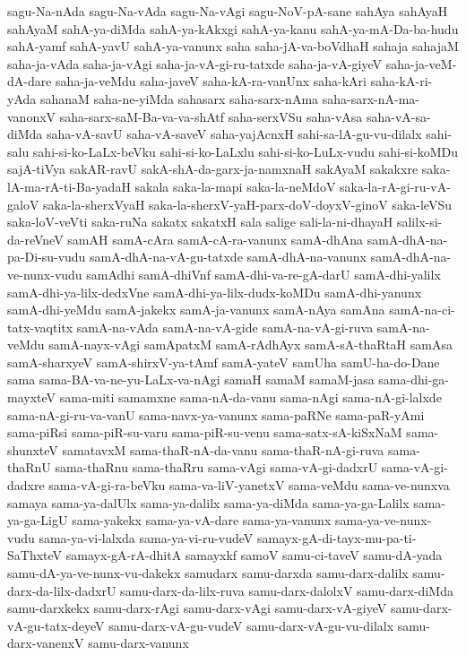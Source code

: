 {sagu-Na-nAda
sagu-Na-vAda
sagu-Na-vAgi
sagu-NoV-pA-sane
sahAya
sahAyaH
sahAyaM
sahA-ya-diMda
sahA-ya-kAkxgi
sahA-ya-kanu
sahA-ya-mA-Da-ba-hudu
sahA-yamf
sahA-yavU
sahA-ya-vanunx
saha
saha-jA-va-boVdhaH
sahaja
sahajaM
saha-ja-vAda
saha-ja-vAgi
saha-ja-vA-gi-ru-tatxde
saha-ja-vA-giyeV
saha-ja-veM-dA-dare
saha-ja-veMdu
saha-javeV
saha-kA-ra-vanUnx
saha-kAri
saha-kA-ri-yAda
sahanaM
saha-ne-yiMda
sahasarx
saha-sarx-nAma
saha-sarx-nA-ma-vanonxV
saha-sarx-saM-Ba-va-va-shAtf
saha-serxVSu
saha-vAsa
saha-vA-sa-diMda
saha-vA-savU
saha-vA-saveV
saha-yajAcnxH
sahi-sa-lA-gu-vu-dilalx
sahi-salu
sahi-si-ko-LaLx-beVku
sahi-si-ko-LaLxlu
sahi-si-ko-LuLx-vudu
sahi-si-koMDu
sajA-tiVya
sakAR-ravU
sakA-shA-da-garx-ja-namxnaH
sakAyaM
sakakxre
saka-lA-ma-rA-ti-Ba-yadaH
sakala
saka-la-mapi
saka-la-neMdoV
saka-la-rA-gi-ru-vA-galoV
saka-la-sherxVyaH
saka-la-sherxV-yaH-parx-doV-doyxV-ginoV
saka-leVSu
saka-loV-veVti
saka-ruNa
sakatx
sakatxH
sala
salige
sali-la-ni-dhayaH
salilx-si-da-reVneV
samAH
samA-cAra
samA-cA-ra-vanunx
samA-dhAna
samA-dhA-na-pa-Di-su-vudu
samA-dhA-na-vA-gu-tatxde
samA-dhA-na-vanunx
samA-dhA-na-ve-nunx-vudu
samAdhi
samA-dhiVnf
samA-dhi-va-re-gA-darU
samA-dhi-yalilx
samA-dhi-ya-lilx-dedxVne
samA-dhi-ya-lilx-dudx-koMDu
samA-dhi-yanunx
samA-dhi-yeMdu
samA-jakekx
samA-ja-vanunx
samA-nAya
samAna
samA-na-ci-tatx-vaqtitx
samA-na-vAda
samA-na-vA-gide
samA-na-vA-gi-ruva
samA-na-veMdu
samA-nayx-vAgi
samApatxM
samA-rAdhAyx
samA-sA-thaRtaH
samAsa
samA-sharxyeV
samA-shirxV-ya-tAmf
samA-yateV
samUha
samU-ha-do-Dane
sama
sama-BA-va-ne-yu-LaLx-va-nAgi
samaH
samaM
samaM-jasa
sama-dhi-ga-mayxteV
sama-miti
samamxne
sama-nA-da-vanu
sama-nAgi
sama-nA-gi-lalxde
sama-nA-gi-ru-va-vanU
sama-navx-ya-vanunx
sama-paRNe
sama-paR-yAmi
sama-piRsi
sama-piR-su-varu
sama-piR-su-venu
sama-satx-sA-kiSxNaM
sama-shunxteV
samatavxM
sama-thaR-nA-da-vanu
sama-thaR-nA-gi-ruva
sama-thaRnU
sama-thaRnu
sama-thaRru
sama-vAgi
sama-vA-gi-dadxrU
sama-vA-gi-dadxre
sama-vA-gi-ra-beVku
sama-va-liV-yanetxV
sama-veMdu
sama-ve-nunxva
samaya
sama-ya-dalUlx
sama-ya-dalilx
sama-ya-diMda
sama-ya-ga-Lalilx
sama-ya-ga-LigU
sama-yakekx
sama-ya-vA-dare
sama-ya-vanunx
sama-ya-ve-nunx-vudu
sama-ya-vi-lalxda
sama-ya-vi-ru-vudeV
samayx-gA-di-tayx-mu-pa-ti-SaThxteV
samayx-gA-rA-dhitA
samayxkf
samoV
samu-ci-taveV
samu-dA-yada
samu-dA-ya-ve-nunx-vu-dakekx
samudarx
samu-darxda
samu-darx-dalilx
samu-darx-da-lilx-dadxrU
samu-darx-da-lilx-ruva
samu-darx-dalolxV
samu-darx-diMda
samu-darxkekx
samu-darx-rAgi
samu-darx-vAgi
samu-darx-vA-giyeV
samu-darx-vA-gu-tatx-deyeV
samu-darx-vA-gu-vudeV
samu-darx-vA-gu-vu-dilalx
samu-darx-vanenxV
samu-darx-vanunx
}
